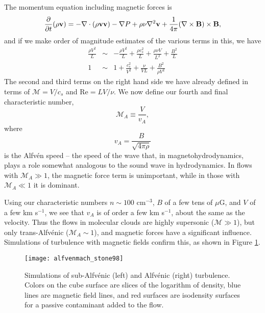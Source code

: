 The momentum equation including magnetic forces is
\begin{equation}
\frac{\partial}{\partial t}(\rho \mathbf{v}) = -\nabla \cdot(\rho \mathbf{v v}) - \nabla P + \rho \nu \nabla^2 \mathbf{v} + \frac{1}{4\pi} (\nabla\times\mathbf{B})\times \mathbf{B},
\end{equation}
and if we make order of magnitude estimates of the various terms in this, we have
\begin{eqnarray}
\frac{\rho V^2}{L} & \sim & -\frac{\rho V^2}{L} + \frac{\rho c_s^2}{L} + \frac{\rho \nu V}{L^2} + \frac{B^2}{L} \\
1 & \sim & 1 + \frac{c_s^2}{V^2} + \frac{\nu}{VL} + \frac{B^2}{\rho V^2}
\end{eqnarray}
The second and third terms on the right hand side we have already defined in terms of $\mathcal{M}= V/c_s$ and $\mathrm{Re} = LV/\nu$. We now define our fourth and final characteristic number,
\begin{equation}
\mathcal{M}_A \equiv \frac{V}{v_A},
\end{equation}
where
\begin{equation}
v_A = \frac{B}{\sqrt{4\pi \rho}}
\end{equation}
is the Alfv\'{e}n speed -- the speed of the wave that, in magnetohydrodynamics, plays a role somewhat analogous to the sound wave in hydrodynamics. In flows with $\mathcal{M}_A \gg 1$, the magnetic force term is unimportant, while in those with $\mathcal{M}_A \ll 1$ it is dominant.

Using our characteristic numbers $n\sim 100$ cm$^{-3}$, $B$ of a few tens of $\mu$G, and $V$ of a few km s$^{-1}$, we see that $v_A$ is of order a few km s$^{-1}$, about the same as the velocity. Thus the flows in molecular clouds are highly supersonic ($\mathcal{M}\gg 1$), but only trans-Alfv\'{e}nic ($\mathcal{M}_A \sim 1$), and magnetic forces have a significant influence. Simulations of turbulence with magnetic fields confirm this, as shown in Figure \ref{fig:alfvenmach}.

\begin{figure}
\texttt{[image: alfvenmach\_stone98]}
\caption[Comparison of simulations of Alfv\'{e}nic and sub-Alfv\'{e}nic turbulence]{
\label{fig:alfvenmach}
Simulations of sub-Alfv\'{e}nic (left) and Alfv\'{e}nic (right) turbulence. Colors on the cube surface are slices of the logarithm of density, blue lines are magnetic field lines, and red surfaces are isodensity surfaces for a passive contaminant added to the flow.
}
\end{figure}

